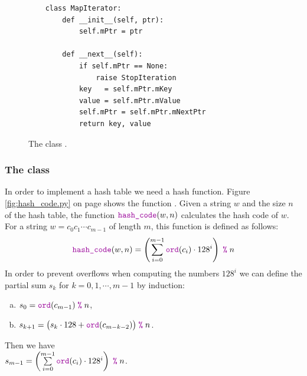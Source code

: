 \begin{figure}[!ht]
\centering
\begin{verbatim}
    class MapIterator:
        def __init__(self, ptr):
            self.mPtr = ptr
        
        def __next__(self):
            if self.mPtr == None:
                raise StopIteration
            key   = self.mPtr.mKey
            value = self.mPtr.mValue
            self.mPtr = self.mPtr.mNextPtr
            return key, value
\end{verbatim}
\vspace*{-0.3cm}
\caption{The class .}
\label{fig:MapIterator.ipynb}
\end{figure}


\subsubsection{The class }
In order to implement a hash table we need a hash function.  Figure \ref{fig:hash_code.py} on page
\pageref{fig:hash_code.py} shows the function .
Given a string $w$ and the size $n$ of the hash table, the function $\mytt{hash\_code}(w, n)$ calculates the
hash code of $w$.  For a string  
$w = c_0c_1\cdots c_{m-1}$ of length $m$, this function is defined as follows:
$$ \mytt{hash\_code}(w, n) = \left(\sum\limits_{i=0}^{m-1} \mytt{ord}(c_i) \cdot 128^i\right) \;\mytt{\symbol{37}}\; n  $$
In order to prevent overflows when computing the numbers $128^i$ we can define the partial sum $s_k$ for
$k=0,1,\cdots,m-1$ by induction:
\begin{enumerate}[(a)]
\item $s_{0} = \mytt{ord}(c_{m-1}) \;\mytt{\symbol{37}}\; n$,
\item $s_{k+1} = \bigl(s_k \cdot 128 + \mytt{ord}(c_{m-k-2}) \bigr) \;\mytt{\symbol{37}}\; n$.
\end{enumerate}
Then we have
\\[0.2cm]
\hspace*{1.3cm}
$s_{m-1} = \left(\sum\limits_{i=0}^{m-1} \mytt{ord}(c_i) \cdot 128^i\right) \;\mytt{\symbol{37}}\; n$.

